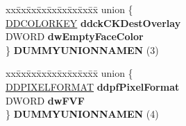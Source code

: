\begin{DoxyCompactItemize}
\begin{tabbing}
\end{tabbing}\item 
\mbox{\label{struct___d_d_s_u_r_f_a_c_e_d_e_s_c2_ae0ebff373cc309a82bf1da3460eb401a}} 
\begin{tabbing}
xx\=xx\=xx\=xx\=xx\=xx\=xx\=xx\=xx\=\kill
union \{\\
\>\hyperlink{struct_d_d_c_o_l_o_r_k_e_y}{DDCOLORKEY} {\bfseries ddckCKDestOverlay}\\
\>DWORD {\bfseries dwEmptyFaceColor}\\
\} {\bfseries DUMMYUNIONNAMEN} (3)\\

\end{tabbing}\item 
\mbox{\label{struct___d_d_s_u_r_f_a_c_e_d_e_s_c2_a98bcc0f743ceb84c185eb28f20ab8744}} 
\begin{tabbing}
xx\=xx\=xx\=xx\=xx\=xx\=xx\=xx\=xx\=\kill
union \{\\
\>\hyperlink{struct___d_d_p_i_x_e_l_f_o_r_m_a_t}{DDPIXELFORMAT} {\bfseries ddpfPixelFormat}\\
\>DWORD {\bfseries dwFVF}\\
\} {\bfseries DUMMYUNIONNAMEN} (4)\\

\end{tabbing}\end{DoxyCompactItemize}
